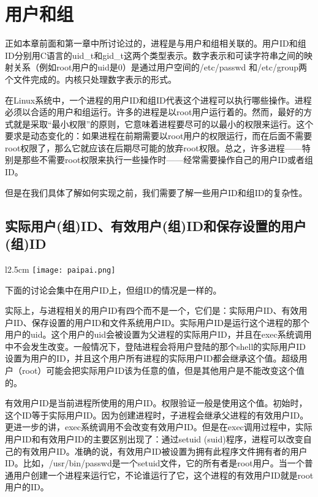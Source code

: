 \section{用户和组}

正如本章前面和第一章中所讨论过的，进程是与用户和组相关联的。用户ID和组ID分别用C语言的uid\_t和gid\_t这两个类型表示。数字表示和可读字符串之间的映射关系（例如root用户的uid是0）是通过用户空间的/etc/passwd 和/etc/group两个文件完成的。内核只处理数字表示的形式。

在Linux系统中，一个进程的用户ID和组ID代表这个进程可以执行哪些操作。进程必须以合适的用户和组运行。许多的进程是以root用户运行着的。然而，最好的方式就是采取“最小权限”的原则，它意味着进程要尽可的以最小的权限来运行。这个要求是动态变化的：如果进程在前期需要以root用户的权限运行，而在后面不需要root权限了，那么它就应该在后期尽可能的放弃root权限。总之，许多进程——特别是那些不需要root权限来执行一些操作时——经常需要操作自己的用户ID或者组ID。

但是在我们具体了解如何实现之前，我们需要了解一些用户ID和组ID的复杂性。

\subsection{实际用户(组)ID、有效用户(组)ID和保存设置的用户(组)ID}

\begin{wrapfigure}{l}{2.5cm}
  \texttt{[image: paipai.png]}
\end{wrapfigure}
\mbox{}下面的讨论会集中在用户ID上，但组ID的情况是一样的。

实际上，与进程相关的用户ID有四个而不是一个，它们是：实际用户ID、有效用户ID、保存设置的用户ID和文件系统用户ID。实际用户ID是运行这个进程的那个用户的uid。这个用户的uid会被设置为父进程的实际用户ID，并且在exec系统调用中不会发生改变。一般情况下，登陆进程会将用户登陆的那个shell的实际用户ID设置为用户的ID，并且这个用户所有进程的实际用户ID都会继承这个值。超级用户（root）可能会把实际用户ID该为任意的值，但是其他用户是不能改变这个值的。

有效用户ID是当前进程所使用的用户ID。权限验证一般是使用这个值。初始时，这个ID等于实际用户ID。因为创建进程时，子进程会继承父进程的有效用户ID。更进一步的讲，exec系统调用不会改变有效用户ID。但是在exec调用过程中，实际用户ID和有效用户ID的主要区别出现了：通过setuid (suid)程序，进程可以改变自己的有效用户ID。准确的说，有效用户ID被设置为拥有此程序文件拥有者的用户ID。比如，/usr/bin/passwd是一个setuid文件，它的所有者是root用户。当一个普通用户创建一个进程来运行它，不论谁运行了它，这个进程的有效用户ID就是root用户的ID。

